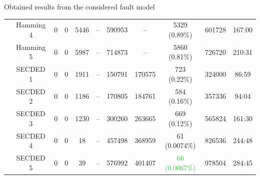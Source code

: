 \begin{frame}{Obtained results from the considered fault model}
\begin{table}[H]
\begin{tabular}{@{}ccccccccccc@{}}
                                                               & Hamming 4     & 0     & 0            & 5446  & --          & \num{590953}                             & --                                      & 5329 {\tiny (0.89\%)}                        & \num{601728} & 167:00                                  \\
                                                               & Hamming 5     & 0     & 0            & 5987  & --          & \num{714873}                             & --                                      & 5860 {\tiny (0.81\%)}                        & \num{726720} & 210:31                                  \\
                                                               & SECDED 1      & 0     & 0            & 1911  & --          & \num{150791}                             & \num{170575}                            & 723 {\tiny (0.22\%)}                         & \num{324000} & 86:59                                   \\
                                                               & SECDED 2      & 0     & 0            & 1186  & --          & \num{170805}                             & \num{184761}                            & 584 {\tiny (0.16\%)}                         & \num{357336} & 94:04                                   \\
                                                               & SECDED 3      & 0     & 0            & 1230  & --          & \num{300260}                             & \num{263665}                            & 669 {\tiny (0.12\%)}                         & \num{565824} & 161:30                                  \\
                                                               & SECDED 4      & 0     & 0            & 18    & --          & \num{457498}                             & \num{368959}                            & 61 {\tiny (0.0074\%)}                          & \num{826536} & 244:48                                  \\
                                                               & SECDED 5      & 0     & 0            & 39    & --          & \num{576992}                             & \num{401407}                            & \textcolor{LimeGreen}{66 {\tiny (0.0067\%)}}   & \num{978504} & 284:45                                  \\
            \bottomrule
        \end{tabular}
    \end{table}
\end{frame}
